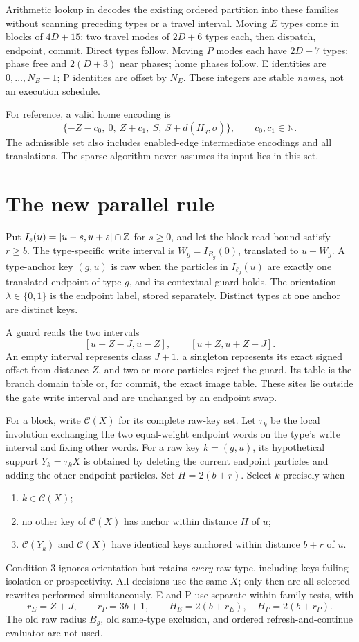 \documentclass[11pt,a4paper]{article}
\numberwithin{equation}{section}
\newcommand{\file}[1]{\texttt{\detokenize{#1}}}
\newcommand{\calC}{\mathcal C}\newcommand{\gebit}{\operatorname{ge}}\newcommand{\bitlen}{\operatorname{bits}}
\begin{document}
Arithmetic lookup in \file{gate_at(i)} decodes the existing ordered partition into these families without scanning preceding types or a travel interval. Moving $E$ types come in blocks of $4D+15$: two travel modes of $2D+6$ types each, then dispatch, endpoint, commit. Direct types follow. Moving $P$ modes each have $2D+7$ types: phase free and $2(D+3)$ near phases; home phases follow. E identities are $0,\ldots,N_E-1$; P identities are offset by $N_E$. These integers are stable \emph{names}, not an execution schedule.

For reference, a valid home encoding is
\[
\{-Z-c_0,\ 0,\ Z+c_1,\ S,\ S+d(H_q,\sigma)\},\qquad c_0,c_1\in\mathbb N.
\]
The admissible set also includes enabled-edge intermediate encodings and all translations. The sparse algorithm never assumes its input lies in this set.

\section{The new parallel rule}
Put $I_s(u)=[u-s,u+s]\cap\mathbb Z$ for $s\ge0$, and let the block read bound satisfy $r\ge b$. The type-specific write interval is $W_g=I_{B_g}(0)$, translated to $u+W_g$. A type-anchor key $(g,u)$ is raw when the particles in $I_{\ell_g}(u)$ are exactly one translated endpoint of type $g$, and its contextual guard holds. The orientation $\lambda\in\{0,1\}$ is the endpoint label, stored separately. Distinct types at one anchor are distinct keys.

A guard reads the two intervals
\[
[u-Z-J,u-Z],\qquad[u+Z,u+Z+J].
\]
An empty interval represents class $J+1$, a singleton represents its exact signed offset from distance $Z$, and two or more particles reject the guard. Its table is the branch domain table or, for commit, the exact image table. These sites lie outside the gate write interval and are unchanged by an endpoint swap.

For a block, write $\calC(X)$ for its complete raw-key set. Let $\tau_k$ be the local involution exchanging the two equal-weight endpoint words on the type's write interval and fixing other words. For a raw key $k=(g,u)$, its hypothetical support $Y_k=\tau_kX$ is obtained by deleting the current endpoint particles and adding the other endpoint particles. Set $H=2(b+r)$. Select $k$ precisely when
\begin{enumerate}
\item $k\in\calC(X)$;
\item no other key of $\calC(X)$ has anchor within distance $H$ of $u$;
\item $\calC(Y_k)$ and $\calC(X)$ have identical keys anchored within distance $b+r$ of $u$.
\end{enumerate}
Condition 3 ignores orientation but retains \emph{every} raw type, including keys failing isolation or prospectivity. All decisions use the same $X$; only then are all selected rewrites performed simultaneously. E and P use separate within-family tests, with
\[
r_E=Z+J,\qquad r_P=3b+1,\qquad H_E=2(b+r_E),\quad H_P=2(b+r_P).
\]
The old raw radius $B_g$, old same-type exclusion, and ordered refresh-and-continue evaluator are not used.
\end{document}
